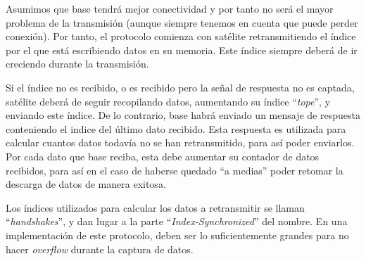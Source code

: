 \documentclass{article}
\begin{document}
Asumimos que base tendrá mejor conectividad y por tanto no será el mayor problema de la transmisión (aunque siempre tenemos en cuenta que puede perder conexión). Por tanto, el protocolo comienza con satélite retransmitiendo el índice por el que está escribiendo datos en su memoria. Este índice siempre deberá de ir creciendo durante la transmisión.

Si el índice no es recibido, o es recibido pero la señal de respuesta no es captada, satélite deberá de seguir recopilando datos, aumentando su índice ``\textit{tope}'', y enviando este índice. De lo contrario, base habrá enviado un mensaje de respuesta conteniendo el indice del último dato recibido. Esta respuesta es utilizada para calcular cuantos datos todavía no se han retransmitido, para así poder enviarlos. Por cada dato que base reciba, esta debe aumentar su contador de datos recibidos, para así en el caso de haberse quedado ``a medias'' poder retomar la descarga de datos de manera exitosa.

Los índices utilizados para calcular los datos a retransmitir se llaman ``\textit{handshakes}'', y dan lugar a la parte ``\textit{Index-Synchronized}'' del nombre. En una implementación de este protocolo, deben ser lo suficientemente grandes para no hacer \textit{overflow} durante la captura de datos.
\end{document}
